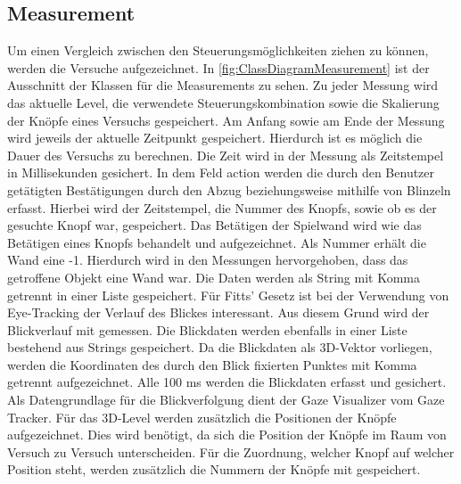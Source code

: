 \subsection{Measurement}
\label{section:measurement}
Um einen Vergleich zwischen den Steuerungsmöglichkeiten ziehen zu können, werden die Versuche aufgezeichnet. In \autoref{fig:ClassDiagramMeasurement} ist der Ausschnitt der Klassen für die Measurements zu sehen. Zu jeder Messung wird das aktuelle Level, die verwendete Steuerungskombination sowie die Skalierung der Knöpfe eines Versuchs gespeichert. Am Anfang sowie am Ende der Messung wird jeweils der aktuelle Zeitpunkt gespeichert. Hierdurch ist es möglich die Dauer des Versuchs zu berechnen. Die Zeit wird in der Messung als Zeitstempel in Millisekunden gesichert. In dem Feld action werden die durch den Benutzer getätigten Bestätigungen durch den Abzug beziehungsweise mithilfe von Blinzeln erfasst. Hierbei wird der Zeitstempel, die Nummer des Knopfs, sowie ob es der gesuchte Knopf war, gespeichert. Das Betätigen der Spielwand  wird wie das Betätigen eines Knopfs behandelt und aufgezeichnet. Als Nummer erhält die Wand eine -1. Hierdurch wird in den Messungen hervorgehoben, dass das getroffene Objekt eine Wand war.  Die Daten werden als String mit Komma getrennt in einer Liste gespeichert. Für Fitts' Gesetz ist bei der Verwendung von Eye-Tracking der Verlauf des Blickes interessant. Aus diesem Grund wird der Blickverlauf mit gemessen. Die Blickdaten werden ebenfalls in einer Liste bestehend aus Strings gespeichert. Da die Blickdaten als 3D-Vektor vorliegen, werden die Koordinaten des durch den Blick fixierten Punktes mit Komma getrennt aufgezeichnet. Alle 100 ms  werden die Blickdaten erfasst und gesichert. Als Datengrundlage für die Blickverfolgung dient der Gaze Visualizer vom Gaze Tracker. Für das 3D-Level werden zusätzlich die Positionen der Knöpfe aufgezeichnet. Dies wird benötigt, da sich die Position der Knöpfe im Raum von Versuch zu Versuch unterscheiden. Für die Zuordnung, welcher Knopf auf welcher Position steht, werden zusätzlich die Nummern der Knöpfe mit gespeichert.

